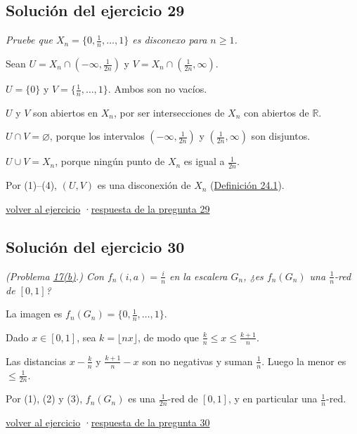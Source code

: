 \documentclass[11pt,a4paper]{article}
\newcommand{\R}{\mathbb{R}}\newcommand{\N}{\mathbb{N}}\newcommand{\Q}{\mathbb{Q}}
\begin{document}
\subsection*{\hypertarget{s-29}{}Solución del ejercicio 29}
\emph{Pruebe que $X_n=\{0,\frac1n,\dots,1\}$ es disconexo para $n\ge1$.}
\begin{pasos}
\item[] Sean $U=X_n\cap(-\infty,\frac1{2n})$ y $V=X_n\cap(\frac1{2n},\infty)$.
\item[(1)] $U=\{0\}$ y $V=\{\frac1n,\dots,1\}$. Ambos son no vacíos.
\item[(2)] $U$ y $V$ son abiertos en $X_n$, por ser intersecciones de $X_n$ con abiertos de $\R$.
\item[(3)] $U\cap V=\varnothing$, porque los intervalos $(-\infty,\frac1{2n})$ y $(\frac1{2n},\infty)$ son disjuntos.
\item[(4)] $U\cup V=X_n$, porque ningún punto de $X_n$ es igual a $\frac1{2n}$.
\item[] Por (1)–(4), $(U,V)$ es una disconexión de $X_n$ (\href{https://decostruttivismo.github.io/MAT2514-repaso/pdf/MAT2514_apuntes_completos.pdf\#nameddest=teorema.24.1}{Definición 24.1}).
\end{pasos}
\par{\small \hyperlink{x-29}{volver al ejercicio} \quad·\quad \hyperlink{r-29}{respuesta de la pregunta 29}}
\subsection*{\hypertarget{s-30}{}Solución del ejercicio 30}
\emph{(Problema \hyperlink{prob-17}{17(b)}.) Con $f_n(i,a)=\frac in$ en la escalera $G_n$, ¿es $f_n(G_n)$ una $\frac1n$-red de $[0,1]$?}
\begin{pasos}
\item[(1)] La imagen es $f_n(G_n)=\{0,\frac1n,\dots,1\}$.
\item[(2)] Dado $x\in[0,1]$, sea $k=\lfloor nx\rfloor$, de modo que $\frac kn\le x\le\frac{k+1}n$.
\item[(3)] Las distancias $x-\frac kn$ y $\frac{k+1}n-x$ son no negativas y suman $\frac1n$. Luego la menor es $\le\frac1{2n}$.
\item[] Por (1), (2) y (3), $f_n(G_n)$ es una $\frac1{2n}$-red de $[0,1]$, y en particular una $\frac1n$-red.
\end{pasos}
\par{\small \hyperlink{x-30}{volver al ejercicio} \quad·\quad \hyperlink{r-30}{respuesta de la pregunta 30}}
\end{document}
